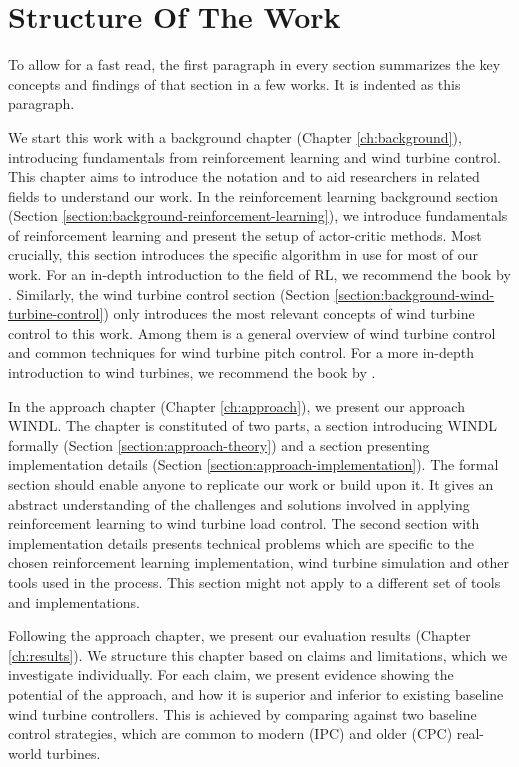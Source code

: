 \section*{Structure Of The Work}

\begin{summary}
To allow for a fast read, the first paragraph in every section summarizes the key concepts and findings of that section in a few works. It is indented as this paragraph.
\end{summary}

We start this work with a background chapter (Chapter \ref{ch:background}), introducing fundamentals from reinforcement learning and wind turbine control. This chapter aims to introduce the notation and to aid researchers in related fields to understand our work. In the reinforcement learning background section (Section \ref{section:background-reinforcement-learning}), we introduce fundamentals of reinforcement learning and present the setup of actor-critic methods. Most crucially, this section introduces the specific algorithm in use for most of our work. For an in-depth introduction to the field of \ac{RL}, we recommend the book by \citet{suttonReinforcementLearningIntroduction2018}. Similarly, the wind turbine control section (Section \ref{section:background-wind-turbine-control}) only introduces the most relevant concepts of wind turbine control to this work. Among them is a general overview of wind turbine control and common techniques for wind turbine pitch control. For a more in-depth introduction to wind turbines, we recommend the book by \citet{burtonWindEnergyHandbook2011}.

In the approach chapter (Chapter \ref{ch:approach}), we present our approach \ac{WINDL}. The chapter is constituted of two parts, a section introducing \ac{WINDL} formally (Section \ref{section:approach-theory}) and a section presenting implementation details (Section \ref{section:approach-implementation}). The formal section should enable anyone to replicate our work or build upon it. It gives an abstract understanding of the challenges and solutions involved in applying reinforcement learning to wind turbine load control. The second section with implementation details presents technical problems which are specific to the chosen reinforcement learning implementation, wind turbine simulation and other tools used in the process. This section might not apply to a different set of tools and implementations.

Following the approach chapter, we present our evaluation results (Chapter \ref{ch:results}). We structure this chapter based on claims and limitations, which we investigate individually. For each claim, we present evidence showing the potential of the approach, and how it is superior and inferior to existing baseline wind turbine controllers. This is achieved by comparing against two baseline control strategies, which are common to modern (\ac{IPC}) and older (\ac{CPC}) real-world turbines.

